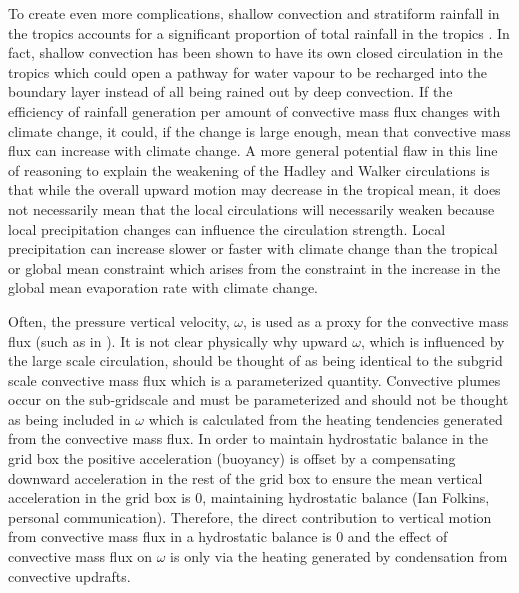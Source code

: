 \documentclass[letterpaper,12pt,titlepage,oneside,final]{book}
\begin{document}
To create even more complications, shallow convection and stratiform rainfall in the tropics accounts for a significant proportion of total rainfall in the tropics \citep{schumacher_stratiform_2003}. In fact, shallow convection has been shown to have its own closed circulation in the tropics \citep{folkins_ian_low-level_2008} which could open a pathway for water vapour to be recharged into the boundary layer instead of all being rained out by deep convection. If the efficiency of rainfall generation per amount of convective mass flux changes with climate change, it could, if the change is large enough, mean that convective mass flux can increase with climate change. A more general potential flaw in this line of reasoning to explain the weakening of the Hadley and Walker circulations is that while the overall upward motion may decrease in the tropical mean, it does not necessarily mean that the local circulations will necessarily weaken \citep{merlis_changes_2011} because local precipitation changes can influence the circulation strength. Local precipitation can increase slower or faster with climate change than the tropical or global mean constraint which arises from the constraint in the increase in the global mean evaporation rate with climate change. 

Often, the pressure vertical velocity, $\omega$, is used as a proxy for the convective mass flux (such as in \cite{vecchi_global_2007,schneider_water_2010}). It is not clear physically why upward $\omega$, which is influenced by the large scale circulation, should be thought of as being identical to the subgrid scale convective mass flux which is a parameterized quantity. Convective plumes occur on the sub-gridscale and must be parameterized and should not be thought as being included in $\omega$ which is calculated from the heating tendencies generated from the convective mass flux. In order to maintain hydrostatic balance in the grid box the positive acceleration (buoyancy) is offset by a compensating downward acceleration in the rest of the grid box to ensure the mean vertical acceleration in the grid box is 0, maintaining hydrostatic balance (Ian Folkins, personal communication).  Therefore, the direct contribution to vertical motion from convective mass flux in a hydrostatic balance is 0 and the effect of convective mass flux on $\omega$ is only via the heating generated by condensation from convective updrafts.
\end{document}

